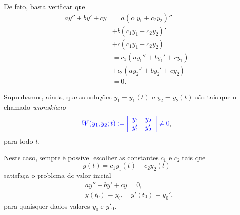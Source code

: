 De fato, basta verificar que
\begin{align}
  ay'' + by' + cy &= a(c_1y_1+c_2y_2)'' \\
                  &+ b(c_1y_1 + c_2y_2)' \\
                  &+ c(c_1y_1 + c_2y_2) \\
                  &= c_1(ay_1'' + by_1' + cy_1) \\
                  &+ c_2(ay_2'' + by_2' + cy_2) \\
                  &= 0.
\end{align}

Suponhamos, ainda, que as soluções $y_1 = y_1(t)$ e $y_2 = y_2(t)$ são tais que o chamado \emph{wronskiano}
\begin{equation}
  {\color{blue}W(y_1,y_2;t) := \left|
    \begin{array}{cc}
      y_1 & y_2 \\
      y_1' & y_2'
    \end{array}
\right| \neq 0},
\end{equation}
para todo $t$.

Neste caso, sempre é possível escolher as constantes $c_1$ e $c_2$ tais que
\begin{equation}\label{eq:od2o_homcc_sg}
  y(t) = c_1y_1(t) + c_2y_2(t)
\end{equation}
satisfaça o problema de valor inicial
\begin{align}
  &ay'' + by' + cy = 0,\\
  &y(t_0) = y_0,\quad y'(t_0) = y_0',
\end{align}
para quaisquer dados valores $y_0$ e $y'_0$.

